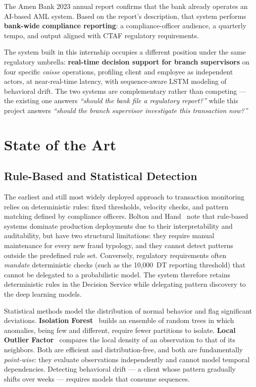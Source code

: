 The Amen Bank 2023 annual report confirms that the bank already operates an AI-based AML system. Based on the report's description, that system performs \textbf{bank-wide compliance reporting}: a compliance-officer audience, a quarterly tempo, and output aligned with CTAF regulatory requirements.

The system built in this internship occupies a different position under the same regulatory umbrella: \textbf{real-time decision support for branch supervisors} on four specific \emph{caisse} operations, profiling client and employee as independent actors, at near-real-time latency, with sequence-aware LSTM modeling of behavioral drift. The two systems are complementary rather than competing --- the existing one answers \emph{``should the bank file a regulatory report?''} while this project answers \emph{``should the branch supervisor investigate this transaction now?''}

\section{State of the Art}

\subsection{Rule-Based and Statistical Detection}

The earliest and still most widely deployed approach to transaction monitoring relies on deterministic rules: fixed thresholds, velocity checks, and pattern matching defined by compliance officers. Bolton and Hand~\cite{bolton} note that rule-based systems dominate production deployments due to their interpretability and auditability, but have two structural limitations: they require manual maintenance for every new fraud typology, and they cannot detect patterns outside the predefined rule set. Conversely, regulatory requirements often \emph{mandate} deterministic checks (such as the 10{,}000~DT reporting threshold) that cannot be delegated to a probabilistic model. The system therefore retains deterministic rules in the Decision Service while delegating pattern discovery to the deep learning models.

Statistical methods model the distribution of normal behavior and flag significant deviations. \textbf{Isolation Forest}~\cite{iforest} builds an ensemble of random trees in which anomalies, being few and different, require fewer partitions to isolate. \textbf{Local Outlier Factor}~\cite{lof} compares the local density of an observation to that of its neighbors. Both are efficient and distribution-free, and both are fundamentally \emph{point-wise}: they evaluate observations independently and cannot model temporal dependencies. Detecting behavioral drift --- a client whose pattern gradually shifts over weeks --- requires models that consume sequences.

